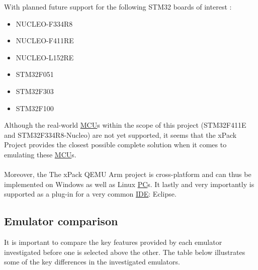 With planned future support for the following STM32 boards of interest \cite{xPack}:

\begin{itemize}
\item NUCLEO-F334R8
\item NUCLEO-F411RE
\item NUCLEO-L152RE
\item STM32F051
\item STM32F303
\item STM32F100
\end{itemize}

Although the real-world \hyperref[listAbr]{MCU}s within the scope of this project (STM32F411E and STM32F334R8-Nucleo) are not yet supported, it seems that the xPack Project provides the closest possible complete solution when it comes to emulating these \hyperref[listAbr]{MCU}s.
\\\\
Moreover, the The xPack QEMU Arm project is cross-platform and can thus be implemented on Windows as well as Linux \hyperref[listAbr]{PC}s. It lastly and very importantly is supported as a plug-in for a very common \hyperref[listAbr]{IDE}: Eclipse.

\newpage\cleardoublepage
\subsection{Emulator comparison}
\label{emulComp}
It is important to compare the key features provided by each emulator investigated before one is selected above the other. The table below illustrates some of the key differences in the investigated emulators.


